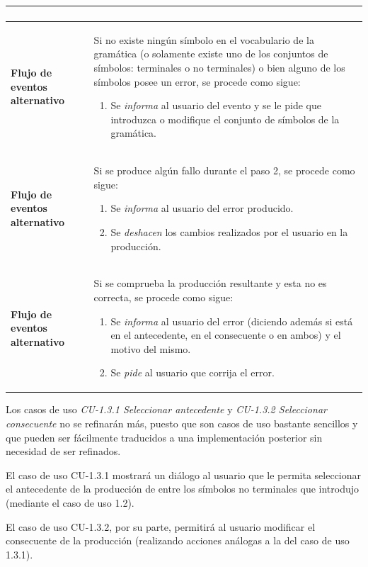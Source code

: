 \begin{longtable}[H]{|>{\columncolor[rgb]{0.63,0.79,0.95}}m{6cm} | m{8.5cm} |}
\begin{enumerate}
         \end{enumerate} \\ \hline
  \textbf{Flujo de eventos alternativo} & Si no existe ningún símbolo en el vocabulario de la gramática (o solamente existe uno de los conjuntos de símbolos: terminales o no terminales) o bien alguno de los símbolos posee un error, se procede como sigue:
     \begin{enumerate}
     \item Se \textit{informa} al usuario del evento y se le pide que introduzca o modifique el conjunto de símbolos de la gramática.
     \end{enumerate} \\ \hline          
  \textbf{Flujo de eventos alternativo} & Si se produce algún fallo durante el paso 2, se procede como sigue:
     \begin{enumerate}
     \item Se \textit{informa} al usuario del error producido.
     \item Se \textit{deshacen} los cambios re\-a\-li\-zados por el usuario en la producción.
     \end{enumerate} \\ \hline              
   \textbf{Flujo de eventos alternativo} & Si se comprueba la producción resultante y esta no es correcta, se procede como sigue:
   \begin{enumerate}
   \item Se \textit{informa} al usuario del error (diciendo además si está en el antecedente,  en el consecuente o en ambos) y el motivo del mismo.
   \item Se \textit{pide} al usuario que corrija el e\-rror.              \end{enumerate}
   \label{tabla75}
 \end{longtable}

 Los casos de uso \textit{CU-1.3.1 Seleccionar antecedente} y \textit{CU-1.3.2 Seleccionar consecuente} no se refinarán más, puesto que son casos de uso bastante sencillos y que pueden ser fácilmente traducidos a una implementación posterior sin necesidad de ser refinados.

 El caso de uso CU-1.3.1 mostrará un diálogo al usuario que le permita seleccionar el antecedente de la producción de entre los símbolos no terminales que introdujo (mediante el caso de uso 1.2).

 El caso de uso CU-1.3.2, por su parte, permitirá al usuario modificar el consecuente de la producción (re\-a\-li\-zando acciones análogas a la del caso de uso 1.3.1).


